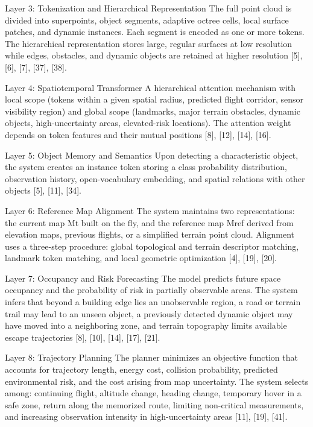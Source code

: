 \documentclass[
]{article}
\begin{document}
Layer 3: Tokenization and Hierarchical Representation The full point
cloud is divided into superpoints, object segments, adaptive octree
cells, local surface patches, and dynamic instances. Each segment is
encoded as one or more tokens. The hierarchical representation stores
large, regular surfaces at low resolution while edges, obstacles, and
dynamic objects are retained at higher resolution {[}5{]}, {[}6{]},
{[}7{]}, {[}37{]}, {[}38{]}.

Layer 4: Spatiotemporal Transformer A hierarchical attention mechanism
with local scope (tokens within a given spatial radius, predicted flight
corridor, sensor visibility region) and global scope (landmarks, major
terrain obstacles, dynamic objects, high-uncertainty areas,
elevated-risk locations). The attention weight depends on token features
and their mutual positions {[}8{]}, {[}12{]}, {[}14{]}, {[}16{]}.

Layer 5: Object Memory and Semantics Upon detecting a characteristic
object, the system creates an instance token storing a class probability
distribution, observation history, open-vocabulary embedding, and
spatial relations with other objects {[}5{]}, {[}11{]}, {[}34{]}.

Layer 6: Reference Map Alignment The system maintains two
representations: the current map Mt built on the fly, and the reference
map Mref derived from elevation maps, previous flights, or a simplified
terrain point cloud. Alignment uses a three-step procedure: global
topological and terrain descriptor matching, landmark token matching,
and local geometric optimization {[}4{]}, {[}19{]}, {[}20{]}.

Layer 7: Occupancy and Risk Forecasting The model predicts future space
occupancy and the probability of risk in partially observable areas. The
system infers that beyond a building edge lies an unobservable region, a
road or terrain trail may lead to an unseen object, a previously
detected dynamic object may have moved into a neighboring zone, and
terrain topography limits available escape trajectories {[}8{]},
{[}10{]}, {[}14{]}, {[}17{]}, {[}21{]}.

Layer 8: Trajectory Planning The planner minimizes an objective function
that accounts for trajectory length, energy cost, collision probability,
predicted environmental risk, and the cost arising from map uncertainty.
The system selects among: continuing flight, altitude change, heading
change, temporary hover in a safe zone, return along the memorized
route, limiting non-critical measurements, and increasing observation
intensity in high-uncertainty areas {[}11{]}, {[}19{]}, {[}41{]}.
\end{document}
